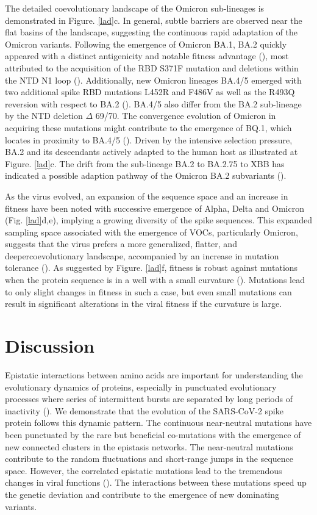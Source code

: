 \documentclass{sysbio}%
\begin{document}
The detailed coevolutionary landscape of the Omicron sub-lineages is demonstrated in Figure. \ref{lad}c. In general, subtle barriers are observed near the flat basins of the landscape, suggesting the continuous rapid adaptation of the Omicron variants. Following the emergence of Omicron BA.1, BA.2 quickly appeared with a distinct antigenicity and notable fitness advantage (\cite{ba2}), most attributed to the acquisition of the RBD S371F mutation and deletions within the NTD N1 loop (\cite{S371F,rdr}). Additionally, new Omicron lineages BA.4/5 emerged with two additional spike RBD mutations L452R and F486V as well as the R493Q reversion with respect to BA.2 (\cite{BA45_emer}). BA.4/5 also differ from the BA.2 sub-lineage by the NTD deletion $\Delta$ 69/70. The convergence evolution of Omicron in acquiring these mutations might contribute to the emergence of BQ.1, which locates in proximity to BA.4/5 (\cite{BQ1}). Driven by the intensive selection pressure, BA.2 and its descendants actively adapted to the human host as illustrated at Figure. \ref{lad}c. The drift from the sub-lineage BA.2 to BA.2.75 to XBB has indicated a possible adaption pathway of the Omicron BA.2 subvariants (\cite{XBB_recom}). 

As the virus evolved, an expansion of the sequence space and an increase in fitness have been noted with successive emergence of Alpha, Delta and Omicron (Fig. \ref{lad}d,e), implying a growing diversity of the spike sequences. This expanded sampling space associated with the emergence of VOCs, particularly Omicron, suggests that the virus prefers a more generalized, flatter, and deepercoevolutionary landscape, accompanied by an increase in mutation tolerance (\cite{tang2021dynamics,sgd_tu}). As suggested by Figure. \ref{lad}f, fitness is robust against mutations when the protein sequence is in a well with a small curvature (\cite{tang2021dynamics}). Mutations lead to only slight changes in fitness in such a case, but even small mutations can result in significant alterations in the viral fitness if the curvature is large. 


\section{Discussion}

Epistatic interactions between amino acids are important for understanding the evolutionary dynamics of proteins, especially in punctuated evolutionary processes where series of intermittent bursts are separated by long periods of inactivity (\cite{gould1977punctuated,raup1986biological}). We demonstrate that the evolution of the SARS-CoV-2 spike protein follows this dynamic pattern. The continuous near-neutral mutations have been punctuated by the rare but beneficial co-mutations with the emergence of new connected clusters in the epistasis networks. The near-neutral mutations contribute to the random fluctuations and short-range jumps in the sequence space. However, the correlated epistatic mutations lead to the tremendous changes in viral functions (\cite{kauffman1991coevolution}). The interactions between these mutations speed up the genetic deviation and contribute to the emergence of new dominating variants. 
\end{document}
